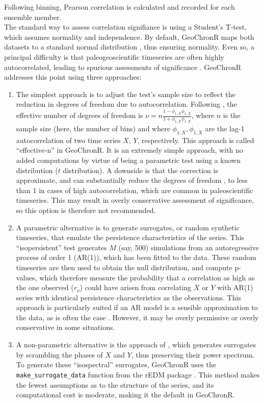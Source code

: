 \documentclass[gchron, manuscript]{copernicus}
\begin{document}
Following binning, Pearson correlation is calculated and recorded for each ensemble member.\\
The standard way to assess correlation signifiance is using a Student's T-test, which assumes normality and independence.
By default, GeoChronR maps both datasets to a standard normal distribution \citep[\citet{vanAlbada2007}]{JEG_Tingley_CP2016}, thus ensuring normality. Even so, a principal difficulty is that paleogeoscientific timeseries are often highly autocorrelated, leading to spurious assessments of significance \citep{Hu_epsl17}. GeoChronR addresses this point using three approaches:

\begin{enumerate}
\def\labelenumi{\arabic{enumi}.}
\item
  The simplest approach is to adjust the test's sample size to reflect the reduction in degrees of freedom due to autocorrelation. Following \citet{bdawdy1964statistical}, the effective number of degrees of freedom is \(\nu = n \frac{1-\phi_{1,X}\phi_{1,X}}{1+\phi_{1,X}\phi_{1,X}}\), where \(n\) is the sample size (here, the number of bins) and where \(\phi_{1,X}, \phi_{1,X}\) are the lag-1 autocorrelation of two
  time series \(X\), \(Y\), respectively. This approach is called ``effective-n'' in GeoChronR. It is an extremely simple approach, with no added computations by virtue of being a parametric test using a known distribution (\(t\) distribution).
  A downside is that the correction is approximate, and can substantially reduce the degrees of freedom \citep{Hu_epsl17}, to less than 1 in cases of high autocorrelation, which are common in paleoscientific timeseries.
  This may result in overly conservative assessment of significance, so this option is therefore not recommended.
\item
  A parametric alternative is to generate surrogates, or random synthetic timeseries, that emulate the persistence characteristics of the series.
  This ``isopersistent'' test generates \(M\) (say, 500) simulations from an autoregressive process of order 1 (AR(1)), which has been fitted to the data.
  These random timeseries are then used to obtain the null distribution, and compute p-values, which therefore measure the probability that a correlation as high as the one observed (\(r_o\)) could have arisen from correlating \(X\) or \(Y\) with AR(1) series with identical persistence characteristics as the observations.
  This approach is particularly suited if an AR model is a sensible approximation to the data, as is often the case \citep{Ghil02}.
  However, it may be overly permissive or overly conservative in some situations.
\item
  A non-parametric alternative is the approach of \citet{Ebisuzaki_JClim97}, which generates surrogates by scrambling the phases of \(X\) and \(Y\), thus preserving their power spectrum.
  To generate these ``isospectral'' surrogates, GeoChronR uses the \texttt{make\_surrogate\_data} function from the rEDM package \citep{rEDM}.
  This method makes the fewest assumptions as to the structure of the series, and its computational cost is moderate, making it the default in GeoChronR.
\end{enumerate}
\end{document}
